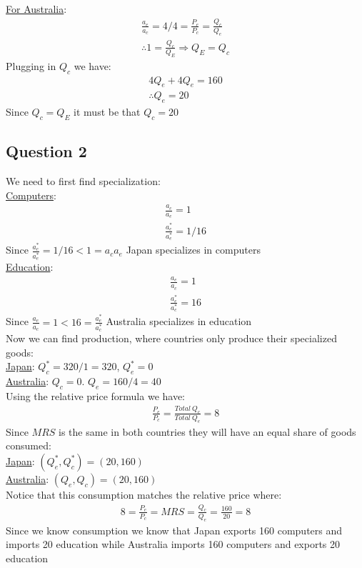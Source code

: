 \documentclass{article}
\begin{document}
\underline{For Australia}:
\begin{gather*}
  \frac{a_{e}}{a_{c}} = 4/4 = \frac{P_{e}}{P_{c}} = \frac{Q_{c}}{Q_{e}} \\
  \therefore 1 = \frac{Q_{c}}{Q_{E}} \Rightarrow Q_{E} = Q_{c}
\end{gather*}
Plugging in $Q_{c}$ we have:
\begin{gather*}
  4Q_{e} + 4Q_{e} = 160 \\
  \therefore Q_{e} = 20
\end{gather*}
Since $Q_{c} = Q_{E}$ it must be that $Q_{c} = 20$

\par \vspace{0.8em}
\subsection{Question 2}

We need to first find specialization: \\
\underline{Computers}:
\begin{gather*}
  \frac{a_{c}}{a_{e}} = 1 \\
  \frac{a_{c}^{*}}{a_{e}^{*}} = 1/16
\end{gather*}
Since $\tfrac{a_{c}^{*}}{a_{e}^{*}} = 1/16 < 1 = {a_{c}}{a_{e}}$ Japan specializes in computers \\
\underline{Education}:
\begin{gather*}
  \frac{a_{e}}{a_{c}} = 1 \\
  \frac{a_{e}^{*}}{a_{c}^{*}} = 16
\end{gather*}
Since $\tfrac{a_{e}}{a_{c}} = 1 < 16 = \tfrac{a_{e}^{*}}{a_{c}^{*}}$ Australia specializes in education \\
\newline Now we can find production, where countries only produce their specialized goods: \\
\underline{Japan}: $Q_{c}^{*} = 320/1 = 320$, $Q_{e}^{*} = 0$ \\
\underline{Australia}: $Q_{c} = 0$. $Q_{e} = 160/4 = 40$ \\
\newline Using the relative price formula we have:
\begin{gather*}
  \frac{P_{e}}{P_{c}} = \frac{Total \ Q_{c}}{Total \ Q_{e}} = 8
\end{gather*}
Since $MRS$ is the same in both countries they will have an equal share of goods consumed: \\
\underline{Japan}: $(Q_{e}^{*}, Q_{c}^{*}) = (20, 160)$ \\
\underline{Australia}: $(Q_{e}, Q_{c}) = (20, 160)$ \\
\newline Notice that this consumption matches the relative price where:
\begin{gather*}
  8 = \tfrac{P_{e}}{P_{c}} = MRS = \tfrac{Q_{c}}{Q_{e}} = \tfrac{160}{20} = 8
\end{gather*}
Since we know consumption we know that Japan exports 160 computers and imports 20 education while Australia imports 160 computers and exports 20 education
\end{document}
